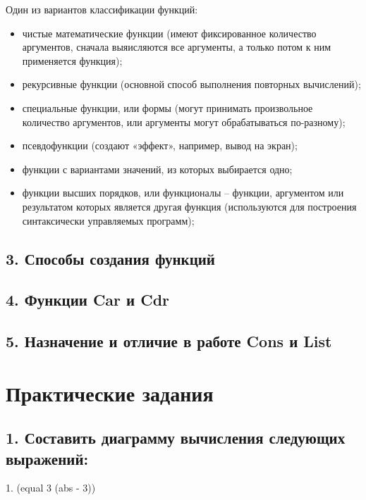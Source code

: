 \documentclass[12pt]{report}
\begin{document}
Один из вариантов классификации функций:

\begin{itemize}
	\item чистые  математические функции (имеют фиксированное количество аргументов, сначала выяисляются все аргументы, а только потом к ним применяется функция);
	\item рекурсивные функции (основной способ выполнения повторных вычислений);
	\item специальные функции, или формы (могут принимать произвольное количество аргументов, или аргументы могут обрабатываться по-разному);
	\item псевдофункции (создают «эффект», например, вывод на экран);
	\item функции с вариантами значений, из которых выбирается одно;
	\item функции высших порядков, или функционалы --  функции, аргументом или  результатом которых является другая функция (используются для построения синтаксически управляемых программ);
\end{itemize}


\section*{3. Способы создания функций}


\section*{4. Функции Car и Cdr}

\section*{5. Назначение и отличие в работе Cons и List}








	
\chapter*{Практические задания}	

\section*{1. Составить диаграмму вычисления следующих выражений:
}

1. (equal 3 (abs - 3))
\end{document}
